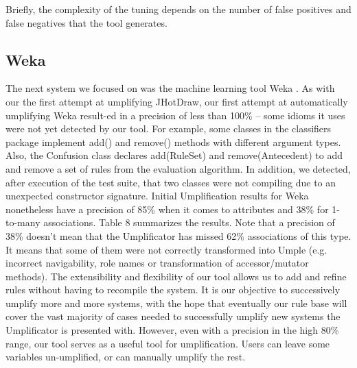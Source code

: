 Briefly, the complexity of the tuning depends on the number of false positives and false negatives that the tool generates.

\subsection{Weka}
 
The next system we focused on was the machine learning tool Weka \cite{Weka}. As with our the first attempt at umplifying JHotDraw, our first attempt at automatically umplifying Weka result-ed in a precision of less than 100\% – some idioms it uses were not yet detected by our tool.
For example, some classes in the classifiers package implement add() and remove() methods with different argument types. Also, the Confusion class declares add(RuleSet) and remove(Antecedent) to add and remove a set of rules from the evaluation algorithm. In addition, we detected, after execution of the test suite, that two classes were not compiling due to an unexpected constructor signature.
Initial Umplification results for Weka nonetheless have a precision of 85\% when it comes to attributes and 38\% for 1-to-many associations. Table 8 summarizes the results. Note that a precision of 38\% doesn't mean that the Umplificator has missed 62\% associations of this type. It means that some of them were not correctly transformed into Umple (e.g. incorrect navigability, role names or transformation of accessor/mutator methods). The extensibility and flexibility of our tool allows us to add and refine rules without having to recompile the system.
It is our objective to successively umplify more and more systems, with the hope that eventually our rule base will cover the vast majority of cases needed to successfully umplify new systems the Umplificator is presented with. However, even with a precision in the high 80\% range, our tool serves as a useful tool for umplification. Users can leave some variables un-umplified, or can manually umplify the rest.

